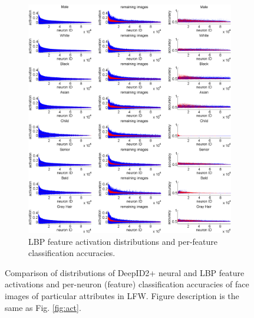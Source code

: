 \documentclass[10pt,twocolumn,letterpaper]{article}
\begin{document}
\begin{figure}[tb!]
\begin{subfigure}{0.98\linewidth}
\includegraphics[width = 0.98\linewidth]{picture/4.png}
\vspace{-0.02in}
\caption{LBP feature activation distributions and per-feature classification accuracies.}
\label{fig:attlbp}
\vspace{0.0in}
\end{subfigure}

\vspace{-0.02in}
\caption{Comparison of distributions of DeepID2+ neural and LBP feature activations and per-neuron (feature) classification accuracies of face images of particular attributes in LFW. Figure description is the same as Fig. \ref{fig:act}.}
\vspace{-0.05in}
\label{fig:att}
\end{figure}
\end{document}
